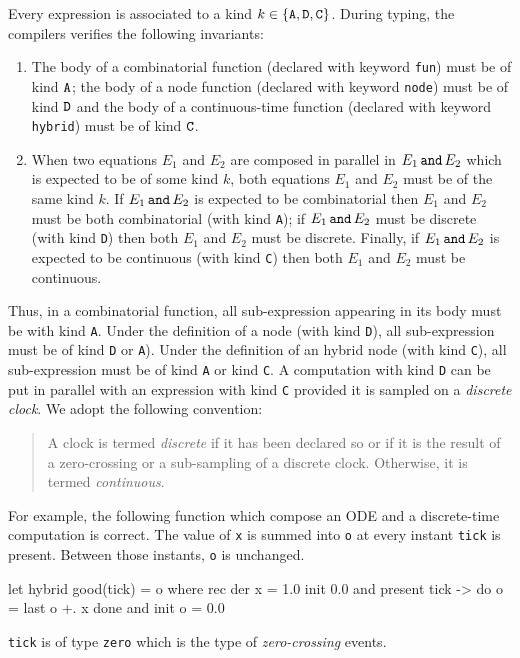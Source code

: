\documentclass[11pt,titlepage,twoside]{report}
\newcommand{\AndEq}[2]{{#1}\,\mbox{{\tt and}}\,{#2}}
\begin{document}
Every expression is associated to a kind $k \in \{\mathtt{A}, \mathtt{D},
\mathtt{C}\}$. During typing, the compilers verifies the following invariants:
\begin{enumerate}
\item
  The body of a combinatorial function (declared with
keyword \verb-fun-) must be of kind $\mathtt{A}$; the body of a node
function (declared with keyword \verb-node-) must be of kind
$\mathtt{D}$ and the body of a continuous-time function (declared with
keyword \verb-hybrid-) must be of kind $\mathtt{C}$. 
\item
  When two equations $E_1$ and $E_2$ are composed in parallel in
  $\AndEq{E_1}{E_2}$ which is expected to be of some kind $k$, both
  equations $E_1$ and $E_2$ must be of the same kind $k$. If
  $\AndEq{E_1}{E_2}$ is expected to be combinatorial then $E_1$ and
  $E_2$ must be both combinatorial (with kind \texttt{A}); if
  $\AndEq{E_1}{E_2}$ must be discrete (with kind \texttt{D}) then both
  $E_1$ and $E_2$ must be discrete. Finally, if $\AndEq{E_1}{E_2}$ is
  expected to be continuous (with kind \texttt{C}) then both $E_1$ and
  $E_2$ must be continuous.
  \end{enumerate}
Thus, in a combinatorial function, all sub-expression appearing in
its body must be with kind \texttt{A}. Under the definition of a node
(with kind \texttt{D}), all sub-expression must be of kind \texttt{D} or
\texttt{A}). Under the definition of an hybrid node (with kind
\texttt{C}), all sub-expression must be of kind \texttt{A} or kind
\texttt{C}. A computation with kind \texttt{D} can be put in parallel
with an expression with kind \texttt{C} provided it is sampled on a
\emph{discrete clock}. We adopt the following convention:
\begin{quote}
{A clock is termed \emph{discrete} if it has been declared so or if it is the 
result of a zero-crossing or a sub-sampling of a discrete clock.
Otherwise, it is termed \emph{continuous}.}
\end{quote}
For example, the following function which compose an ODE and a discrete-time
computation is correct. The value of \texttt{x} is summed into \verb-o- at every
instant \verb-tick- is present. Between those instants, \verb-o- is unchanged.
\begin{chklisting}[withresult]
let hybrid good(tick) = o where
  rec der x = 1.0 init 0.0
  and present tick -> do o = last o +. x done
  and init o = 0.0
\end{chklisting}
\texttt{tick} is of type \texttt{zero} which is the type of
\emph{zero-crossing} events.
\end{document}
